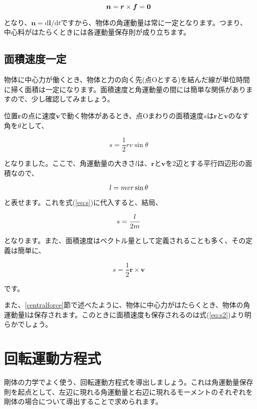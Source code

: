 \begin{equation}
    \bm{n}=\bm{r}\times\bm{f}=\bm{0} \notag
\end{equation}

となり、$\bm{n}=\mathrm{d}\bm{l}/\mathrm{d}t$ですから、物体の角運動量は常に一定となります。つまり、中心料がはたらくときには各運動量保存則が成り立ちます。



\subsection{面積速度一定}
\label{areavelocity}
物体に中心力が働くとき、物体と力の向く先(点Oとする)を結んだ線が単位時間に掃く面積は一定になります。面積速度と角運動量の間には簡単な関係がありますので、少し確認してみましょう。

位置$\bm{r}$の点に速度$\bm{v}$で動く物体があるとき、点Oまわりの面積速度$s$は$\bm{r}$と$\bm{v}$のなす角を$\theta$として、

\begin{equation}
\label{eq:s}
    s = \frac{1}{2}rv\sin\theta
\end{equation}

となりました。ここで、角運動量の大きさ$l$は、$\bm{r}$と$\bm{v}$を2辺とする平行四辺形の面積なので、

\begin{equation}
    l = mvr\sin\theta \notag
\end{equation}

と表せます。これを式(\ref{eq:s})に代入すると、結局、

\begin{equation}
\label{eq:s2}
    s = \frac{l}{2m} \notag
\end{equation}

となります。また、面積速度はベクトル量として定義されることも多く、その定義は簡単に、

\begin{equation}
    s = \frac{1}{2}\bm{r}\times\bm{v}
\end{equation}

です。

また、\ref{centralforce}節で述べたように、物体に中心力がはたらくとき、物体の角運動量$\bm{l}$は保存されます。このときに面積速度も保存されるのは式(\ref{eq:s2})より明らかでしょう。




\section{回転運動方程式}
\label{rotationequation}
剛体の力学でよく使う、回転運動方程式を導出しましょう。これは角運動量保存則を起点として、左辺に現れる角運動量と右辺に現れるモーメントのそれぞれを剛体の場合について導出することで求められます。

